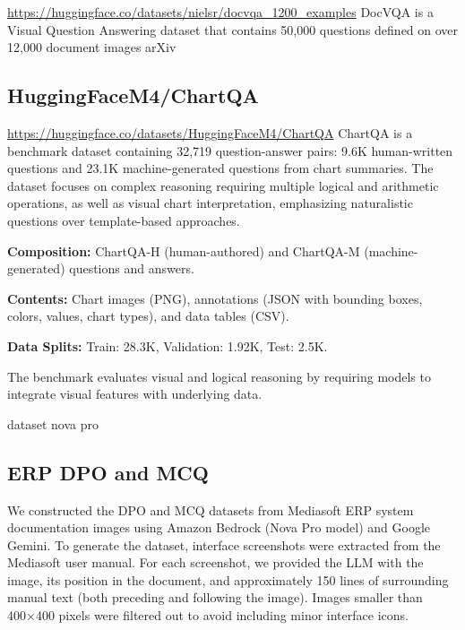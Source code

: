 \documentclass[10pt,conference,compsocconf]{IEEEtran}
\begin{document}
\url{https://huggingface.co/datasets/nielsr/docvqa_1200_examples}
DocVQA is a Visual Question Answering dataset that contains 50,000 questions defined on over 12,000 document images arXiv

\subsection{HuggingFaceM4/ChartQA \cite{masry2022chartqabenchmarkquestionanswering} }



\url{ https://huggingface.co/datasets/HuggingFaceM4/ChartQA}
ChartQA is a benchmark dataset containing 32,719 question-answer pairs: 9.6K human-written questions and 23.1K machine-generated questions from chart summaries. The dataset focuses on complex reasoning requiring multiple logical and arithmetic operations, as well as visual chart interpretation, emphasizing naturalistic questions over template-based approaches.

\textbf{Composition:} ChartQA-H (human-authored) and ChartQA-M (machine-generated) questions and answers.

\textbf{Contents:} Chart images (PNG), annotations (JSON with bounding boxes, colors, values, chart types), and data tables (CSV).

\textbf{Data Splits:} Train: 28.3K, Validation: 1.92K, Test: 2.5K.

The benchmark evaluates visual and logical reasoning by requiring models to integrate visual features with underlying data.


dataset nova pro 

\subsection{ERP DPO and MCQ}

We constructed the DPO and MCQ datasets from Mediasoft ERP system documentation images using Amazon Bedrock (Nova Pro model) and Google Gemini. To generate the dataset, interface screenshots were extracted from the Mediasoft user manual. For each screenshot, we provided the LLM with the image, its position in the document, and approximately 150 lines of surrounding manual text (both preceding and following the image). Images smaller than 400×400 pixels were filtered out to avoid including minor interface icons.
\end{document}
